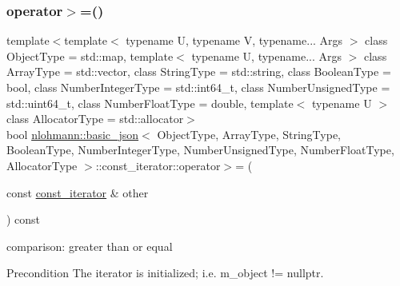 \subsubsection{\texorpdfstring{operator$>$=()}{operator>=()}}
{\footnotesize\ttfamily template$<$template$<$ typename U, typename V, typename... Args $>$ class Object\+Type = std\+::map, template$<$ typename U, typename... Args $>$ class Array\+Type = std\+::vector, class String\+Type  = std\+::string, class Boolean\+Type  = bool, class Number\+Integer\+Type  = std\+::int64\+\_\+t, class Number\+Unsigned\+Type  = std\+::uint64\+\_\+t, class Number\+Float\+Type  = double, template$<$ typename U $>$ class Allocator\+Type = std\+::allocator$>$ \\
bool \hyperlink{classnlohmann_1_1basic__json}{nlohmann\+::basic\+\_\+json}$<$ Object\+Type, Array\+Type, String\+Type, Boolean\+Type, Number\+Integer\+Type, Number\+Unsigned\+Type, Number\+Float\+Type, Allocator\+Type $>$\+::const\+\_\+iterator\+::operator$>$= (\begin{DoxyParamCaption}\item[{const \hyperlink{classnlohmann_1_1basic__json_1_1const__iterator}{const\+\_\+iterator} \&}]{other }\end{DoxyParamCaption}) const\hspace{0.3cm}{\ttfamily [inline]}}



comparison\+: greater than or equal 

\begin{DoxyPrecond}{Precondition}
The iterator is initialized; i.\+e. {\ttfamily m\+\_\+object != nullptr}. 
\end{DoxyPrecond}
\mbox{\label{classnlohmann_1_1basic__json_1_1const__iterator_a70caca372e345c9c700ab849c3d9463b}} 
